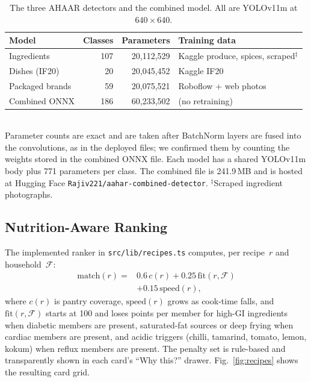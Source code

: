 \documentclass[journal]{IEEEtran}
\begin{document}
\begin{table}[!tb]
\caption{The three AHAAR detectors and the combined model.
All are YOLOv11m at $640\times640$.}
\label{tab:models}
\centering
\footnotesize
\setlength{\tabcolsep}{3pt}
\begin{tabular}{l r r l}
\toprule
\textbf{Model} & \textbf{Classes} & \textbf{Parameters} & \textbf{Training data} \\
\midrule
Ingredients & 107 & 20{,}112{,}529 & Kaggle produce, spices, scraped$^{\ddagger}$ \\
Dishes (IF20) & 20 & 20{,}045{,}452 & Kaggle IF20 \\
Packaged brands & 59 & 20{,}075{,}521 & Roboflow + web photos \\
\midrule
Combined ONNX & 186 & 60{,}233{,}502 & (no retraining) \\
\bottomrule
\end{tabular}
\\[2pt]
{\scriptsize Parameter counts are exact and are taken after
BatchNorm layers are fused into the convolutions, as in the deployed
files; we confirmed them by counting the weights stored in the
combined ONNX file. Each model has a shared YOLOv11m body plus 771
parameters per class. The combined file is 241.9\,MB and is hosted
at Hugging Face \texttt{Rajiv221/aahar-combined-detector}.
$^{\ddagger}$Scraped ingredient photographs.}
\end{table}

\subsection{Nutrition-Aware Ranking}

The implemented ranker in \texttt{src/lib/recipes.ts} computes, per
recipe~\(r\) and household~\(\mathcal{F}\):
\begin{equation}
\begin{split}
\mathrm{match}(r) ={}& 0.6\, c(r) + 0.25\, \mathrm{fit}(r, \mathcal{F})\\
&+ 0.15\, \mathrm{speed}(r),
\end{split}
\label{eq:rank}
\end{equation}
where \(c(r)\) is pantry coverage, \(\mathrm{speed}(r)\) grows as
cook-time falls, and \(\mathrm{fit}(r, \mathcal{F})\) starts at 100
and loses points per member for high-GI ingredients when diabetic
members are present, saturated-fat sources or deep frying when
cardiac members are present, and acidic triggers (chilli, tamarind,
tomato, lemon, kokum) when reflux members are present. The penalty
set is rule-based and transparently shown in each card's ``Why
this?'' drawer. Fig.~\ref{fig:recipes} shows the resulting card grid.
\end{document}
